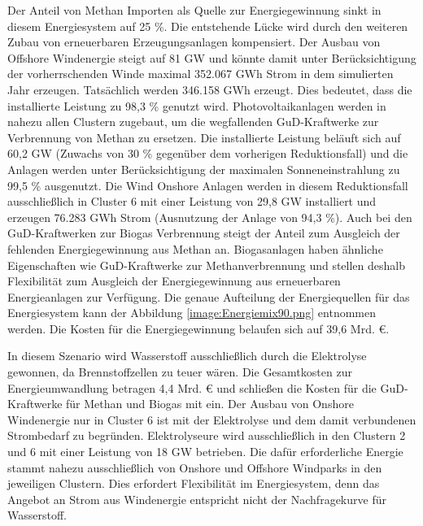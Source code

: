 Der Anteil von Methan Importen als Quelle zur Energiegewinnung sinkt in diesem Energiesystem auf 25 \%. Die entstehende Lücke wird durch den weiteren Zubau von erneuerbaren Erzeugungsanlagen kompensiert. Der Ausbau von Offshore Windenergie steigt auf 81 GW und könnte damit unter Berücksichtigung der vorherrschenden Winde maximal 352.067 GWh Strom in dem simulierten Jahr erzeugen. Tatsächlich werden 346.158 GWh erzeugt. Dies bedeutet, dass die installierte Leistung zu 98,3 \% genutzt wird.
Photovoltaikanlagen werden in nahezu allen Clustern zugebaut, um die wegfallenden GuD-Kraftwerke zur Verbrennung von Methan zu ersetzen. Die installierte Leistung beläuft sich auf 60,2 GW (Zuwachs von 30 \% gegenüber dem vorherigen Reduktionsfall) und die Anlagen werden unter Berücksichtigung der maximalen Sonneneinstrahlung zu 99,5 \% ausgenutzt.
Die Wind Onshore Anlagen werden in diesem Reduktionsfall ausschließlich in Cluster 6 mit einer Leistung von 29,8 GW installiert und erzeugen 76.283 GWh Strom (Ausnutzung der Anlage von 94,3 \%). Auch bei den GuD-Kraftwerken zur Biogas Verbrennung steigt der Anteil zum Ausgleich der fehlenden Energiegewinnung aus Methan an. Biogasanlagen haben ähnliche Eigenschaften wie GuD-Kraftwerke zur Methanverbrennung und stellen deshalb Flexibilität zum Ausgleich der Energiegewinnung aus erneuerbaren Energieanlagen zur Verfügung.
Die genaue Aufteilung der Energiequellen für das Energiesystem kann der Abbildung \ref{image:Energiemix90.png} entnommen werden.
Die Kosten für die Energiegewinnung belaufen sich auf 39,6 Mrd. €.


In diesem Szenario wird Wasserstoff ausschließlich durch die Elektrolyse gewonnen, da Brennstoffzellen zu teuer wären.
Die Gesamtkosten zur Energieumwandlung betragen 4,4 Mrd. € und schließen die Kosten für die GuD-Kraftwerke für Methan und Biogas mit ein.
Der Ausbau von Onshore Windenergie nur in Cluster 6 ist mit der Elektrolyse und dem damit verbundenen Strombedarf zu begründen. 
Elektrolyseure wird ausschließlich in den Clustern 2 und 6 mit einer Leistung von 18 GW betrieben. Die dafür erforderliche Energie stammt nahezu ausschließlich von Onshore und Offshore Windparks in den jeweiligen Clustern. Dies erfordert Flexibilität im Energiesystem, denn das Angebot an Strom aus Windenergie entspricht nicht der Nachfragekurve für Wasserstoff. 

